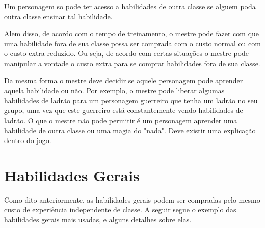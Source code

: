 Um personagem so pode ter acesso a habilidades de outra classe se alguem poda outra classe ensinar tal habilidade.

Alem disso, de acordo com o tempo de treinamento, o mestre pode fazer com que uma habilidade fora de sua classe possa ser comprada com o custo normal ou com o custo extra reduzido. Ou seja, de acordo com certas situações o mestre pode manipular a vontade o custo extra para se comprar habilidades fora de sua classe.

Da mesma forma o mestre deve decidir se aquele personagem pode aprender aquela habilidade ou não. Por exemplo, o mestre pode liberar algumas habilidades de ladrão para um personagem guerreiro que tenha um ladrão no seu grupo, uma vez que este guerreiro está constantemente vendo habilidades de ladrão. O que o mestre não pode permitir é um personagem aprender uma habilidade de outra classe ou uma magia do "nada". Deve existir uma explicação dentro do jogo.

\section{Habilidades Gerais}

Como dito anteriormente, as habilidades gerais podem ser compradas pelo mesmo custo de experiência independente de classe. A seguir segue o exemplo das habilidades gerais mais usadas, e alguns detalhes sobre elas. 


